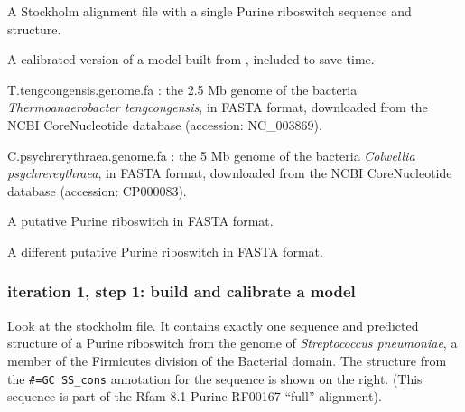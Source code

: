   \begin{sreitems}{}
  \item[\prog{purine.1.sto}] A Stockholm alignment file with a single
       Purine riboswitch sequence and structure. 
  \item[\prog{purine.1.c.cm}] A calibrated version of a model built
    from , included to save time.
  \item[T.tengcongensis.genome.fa]: the 2.5 Mb genome of the bacteria
    \emph{Thermoanaerobacter tengcongensis}, in
    FASTA format, downloaded from the NCBI CoreNucleotide database
    (accession: NC\_003869). 
  \item[C.psychrerythraea.genome.fa]: the 5 Mb genome of the bacteria
    \emph{Colwellia psychrereythraea}, in
    FASTA format, downloaded from the NCBI CoreNucleotide database
    (accession: CP000083). 
  \item[\prog{purine.teng.fa}] A putative Purine riboswitch in FASTA format.
  \item[\prog{purine.psych.fa}] A different putative Purine riboswitch in FASTA format.
  \end{sreitems}

\subsubsection{iteration 1, step 1: build and calibrate a model}

Look at the  stockholm file. It contains exactly
one sequence and predicted structure of a Purine riboswitch from the
genome of \emph{Streptococcus pneumoniae}, a member of the Firmicutes
division of the Bacterial domain. The structure from the
{\small\verb+#=GC SS_cons+}
annotation for the sequence is shown on the right. 
(This sequence is part of the Rfam 8.1 Purine RF00167 ``full''
alignment). 

